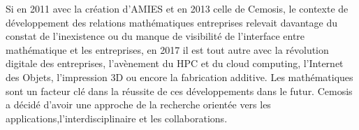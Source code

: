 Si en 2011 avec la création d'AMIES et en 2013 celle de Cemosis, le contexte de développement des relations mathématiques entreprises relevait davantage du constat de l'inexistence ou du manque de visibilité de l'interface entre mathématique et les entreprises, en 2017 il est tout autre avec la révolution digitale des entreprises, l'avènement du HPC et du cloud computing, l'Internet des Objets, l'impression 3D ou encore la fabrication additive. Les mathématiques sont un facteur clé dans la réussite de ces développements dans le futur. Cemosis a décidé d'avoir une approche de la recherche orientée vers les applications,l'interdisciplinaire et les collaborations.
 
 

\vspace{1cm}